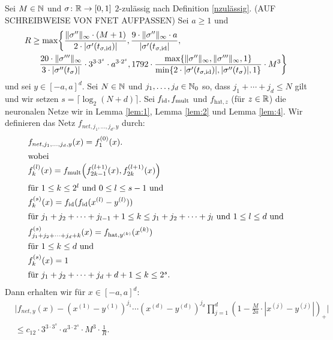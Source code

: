 \begin{lem}
\label{lem:5}
Sei $M \in \mathbb{N}$ und $\sigma\colon \mathbb{R} \to [0, 1]$ $2$-zulässig nach Definition \ref{nzulässig}. (AUF SCHREIBWEISE VON FNET AUFPASSEN)
Sei $a \geq 1$ und 
\begin{equation*}
\begin{split}
R & \geq \max\biggl\{\frac{\|\sigma''\|_{\infty} \cdot (M + 1)}{2 \cdot |\sigma'(t_{\sigma, \mathrm{id}})|}, \frac{9 \cdot \|\sigma''\|_{\infty} \cdot a}{|\sigma'(t_{\sigma, \mathrm{id}}|}, \\
& \quad \frac{20 \cdot \|\sigma'''\|_{\infty}}{3 \cdot |\sigma''(t_{\sigma})|} \cdot 3^{3 \cdot 3^s} \cdot a^{3 \cdot 2^s}, 1792 \cdot \frac{\max\{\|\sigma''\|_{\infty},\|\sigma'''\|_{\infty}, 1\}}{\min\{2 \cdot |\sigma'(t_{\sigma, \mathrm{id}})|, |\sigma''(t_{\sigma})|, 1\}} \cdot M^3 \biggr\}
\end{split}
\end{equation*}
und sei $y \in [-a, a]^d.$ Sei $N \in \mathbb{N}$ und $j_1,\dots,j_d \in \mathbb{N}_0$ so, dass $j_1 + \cdots + j_d \leq N$ gilt und wir setzen $s = \lceil\log_2(N + d)\rceil$. Sei $f_{\mathrm{id}}, f_{\mathrm{mult}}$ und $f_{\mathrm{hat}, z}$ (für $z \in \mathbb{R}$) die neuronalen Netze wir in Lemma \ref{lem:1}, Lemma \ref{lem:2} und Lemma \ref{lem:4}. Wir definieren das Netz $f_{net,j_1,\dots,j_d,y}$ durch:
\begin{align*}
\label{fnet}
& f_{net,j_1,\dots,j_d,y}(x) = f_1^{(0)}(x). \\
\intertext{wobei} 
& f_k^{(l)}(x) = f_{\mathrm{mult}}\Big(f_{2k - 1}^{(l + 1)}(x),f_{2k}^{(l + 1)}(x)\Big) \\
\intertext{für $1 \leq k \leq 2^l$ und $0 \leq l \leq s - 1$ und} 
& f_k^{(s)}(x) = f_{\mathrm{id}}(f_{\mathrm{id}}(x^{(l)} - y^{(l)}))  \\
\intertext{für $j_1 + j_2 + \dots + j_{l-1} + 1 \leq k \leq j_1 + j_2 + \dots + j_l$ und $1 \leq l \leq d$ und} 
& f_{j_1 + j_2 + \dots + j_d + k}^{(s)}(x) = f_{\mathrm{hat},y^{(k)}}(x^{(k)}) \\
\intertext{für $1 \leq k \leq d$ und} 
& f_k^{(s)}(x) = 1 \\
\intertext{für $j_1 + j_2 + \dots + j_d + d + 1 \leq k \leq 2^s.$}
\end{align*} 
Dann erhalten wir für $x \in [-a, a]^d$:
\begin{equation*}
\begin{split}
& \bigg|f_{net, y}(x) - (x^{(1)} - y^{(1)})^{j_1} \cdots (x^{(d)} - y^{(d)})^{j_d} \prod_{j = 1}^d (1 - \frac{M}{2a} \cdot |x^{(j)} - y^{(j)}|)_+\bigg| \\
& \leq c_{12} \cdot 3^{3 \cdot 3^s} \cdot a^{3 \cdot 2^s} \cdot M^3 \cdot \frac{1}{R}.
\end{split}
\end{equation*}
\end{lem}
